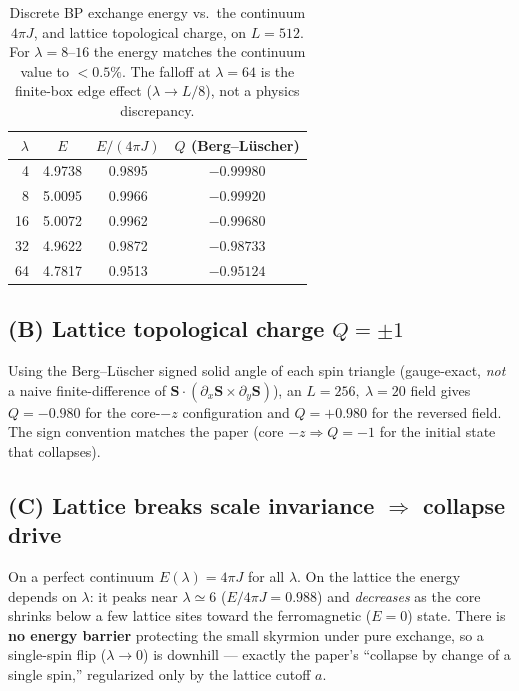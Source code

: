 \documentclass[11pt]{article}
\begin{document}
\begin{table}[h]
\centering
\begin{tabular}{rccc}
\toprule
$\lambda$ & $E$ & $E/(4\pi J)$ & $Q$ (Berg--L\"uscher) \\
\midrule
4  & 4.9738 & 0.9895 & $-0.99980$ \\
8  & 5.0095 & 0.9966 & $-0.99920$ \\
16 & 5.0072 & 0.9962 & $-0.99680$ \\
32 & 4.9622 & 0.9872 & $-0.98733$ \\
64 & 4.7817 & 0.9513 & $-0.95124$ \\
\bottomrule
\end{tabular}
\caption{Discrete BP exchange energy vs.\ the continuum $4\pi J$, and lattice
topological charge, on $L=512$. For $\lambda=8$--$16$ the energy matches the
continuum value to $<0.5\%$. The falloff at $\lambda=64$ is the finite-box edge
effect ($\lambda\!\to\!L/8$), not a physics discrepancy.}
\end{table}

\subsection{(B) Lattice topological charge $Q=\pm1$}
Using the Berg--L\"uscher signed solid angle of each spin triangle (gauge-exact,
\emph{not} a naive finite-difference of
$\mathbf S\!\cdot\!(\partial_x\mathbf S\times\partial_y\mathbf S)$), an
$L=256,\ \lambda=20$ field gives $Q=-0.980$ for the core-$-z$ configuration and
$Q=+0.980$ for the reversed field. The sign convention matches the paper
(core $-z\Rightarrow Q=-1$ for the initial state that collapses).

\subsection{(C) Lattice breaks scale invariance $\Rightarrow$ collapse drive}
On a perfect continuum $E(\lambda)=4\pi J$ for all $\lambda$. On the lattice the
energy depends on $\lambda$: it peaks near $\lambda\simeq6$
($E/4\pi J=0.988$) and \emph{decreases} as the core shrinks below a few lattice
sites toward the ferromagnetic ($E=0$) state. There is \textbf{no energy barrier}
protecting the small skyrmion under pure exchange, so a single-spin flip
($\lambda\!\to\!0$) is downhill --- exactly the paper's ``collapse by change of a
single spin,'' regularized only by the lattice cutoff $a$.
\end{document}
